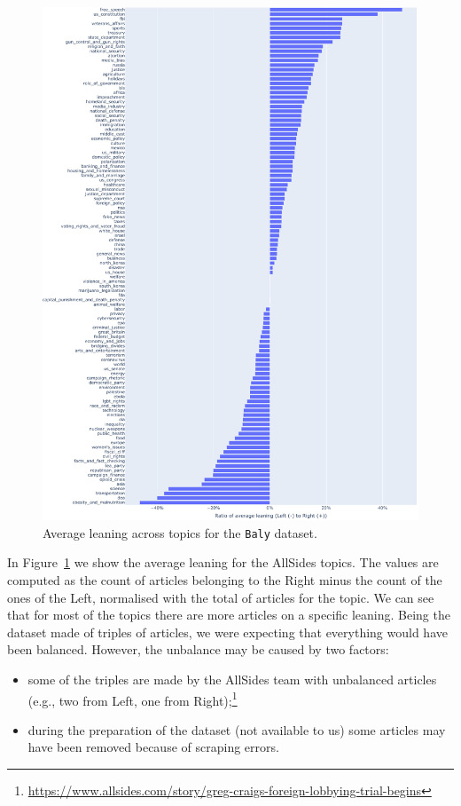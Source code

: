 \begin{figure}[!htbp]
    \centering
    \includegraphics[width=\linewidth]{figures/baly_original_topics_by_leaning_simple.pdf}
    \caption{Average leaning across topics for the \texttt{Baly} dataset.}
    \label{fig:baly_original_topics_by_leaning}
\end{figure}

In Figure~\ref{fig:baly_original_topics_by_leaning} we show the average leaning for the AllSides topics.
The values are computed as the count of articles belonging to the Right minus the count of the ones of the Left, normalised with the total of articles for the topic.
We can see that for most of the topics
there are more articles on a specific leaning. Being the dataset made of triples of articles, we were expecting that everything would have been balanced.
However, the unbalance may be caused by two factors:
\begin{itemize}
    \item some of the triples are made by the AllSides team with unbalanced articles (e.g., two from Left, one from Right);\footnote{\url{https://www.allsides.com/story/greg-craigs-foreign-lobbying-trial-begins}}
    \item during the preparation of the dataset (not available to us) some articles may have been removed because of scraping errors.
\end{itemize}

